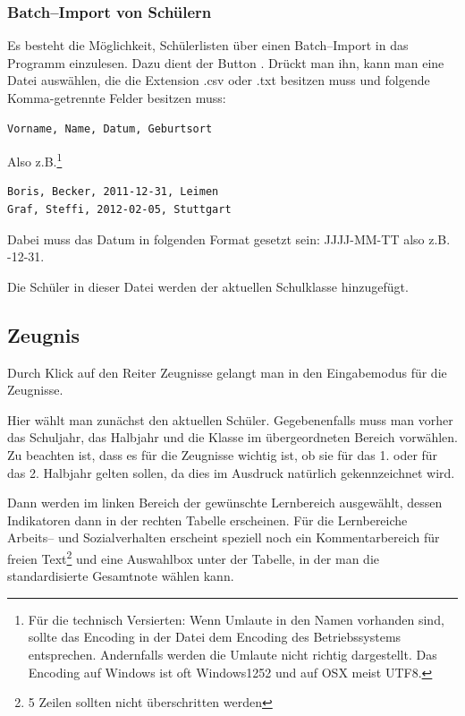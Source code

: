 \documentclass[a4paper,notitlepage,parskip]{scrartcl}
\newcommand\ott{\normalfont\ttfamily}
\begin{document}
\subsubsection{Batch--Import von Schülern}
Es besteht die Möglichkeit, Schülerlisten über einen Batch--Import in das Programm einzulesen.
Dazu dient der Button . Drückt man ihn, kann man eine Datei auswählen, die die Extension {\ott .csv} oder {\ott .txt} besitzen muss und folgende Komma-getrennte Felder besitzen muss:

\begin{lstlisting}
Vorname, Name, Datum, Geburtsort
\end{lstlisting}

Also z.B.\footnote{Für die technisch Versierten: Wenn Umlaute in den Namen vorhanden sind, sollte das Encoding in der Datei dem Encoding des Betriebssystems entsprechen. Andernfalls werden die Umlaute nicht richtig dargestellt. Das Encoding auf Windows ist oft Windows1252 und auf OSX meist UTF8.}

\begin{lstlisting}
Boris, Becker, 2011-12-31, Leimen
Graf, Steffi, 2012-02-05, Stuttgart
\end{lstlisting}



Dabei muss das Datum in folgenden Format gesetzt sein: {\ott JJJJ-MM-TT} also z.B. {\ott 2011-12-31}.

Die Schüler in dieser Datei werden der aktuellen Schulklasse hinzugefügt.

\subsection{Zeugnis}
Durch Klick auf den Reiter {\ott Zeugnisse} gelangt man in den Eingabemodus für die Zeugnisse.

Hier wählt man zunächst den aktuellen Schüler.
Gegebenenfalls muss man vorher das Schuljahr, das Halbjahr und die Klasse im übergeordneten Bereich vorwählen.
Zu beachten ist, dass es für die Zeugnisse wichtig ist, ob sie für das 1. oder für das 2. Halbjahr gelten sollen, da dies im Ausdruck natürlich gekennzeichnet wird.

Dann werden im linken Bereich der gewünschte Lernbereich ausgewählt, dessen Indikatoren dann in der rechten Tabelle erscheinen.
Für die Lernbereiche Arbeits-- und Sozialverhalten erscheint speziell noch ein Kommentarbereich für freien Text\footnote{5 Zeilen sollten nicht überschritten werden} und eine Auswahlbox unter der Tabelle, in der man die standardisierte Gesamtnote wählen kann. 
\end{document}
